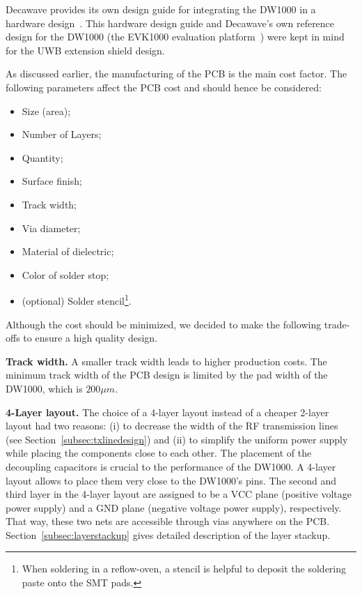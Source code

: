 \documentclass[journal,comsoc]{IEEEtran}
\begin{document}
Decawave provides its own design guide for integrating the DW1000 in a hardware design~\cite{dw1000hwdesignguide}.
This hardware design guide and Decawave's own reference design for the DW1000 (the EVK1000 evaluation platform~\cite{evk1000um}) were kept in mind for the UWB extension shield design.

As discussed earlier, the manufacturing of the PCB is the main cost factor. 
The following parameters affect the PCB cost and should hence be considered:
\begin{itemize}
	\item Size (area);
	\item Number of Layers;
	\item Quantity;
	\item Surface finish;
	\item Track width;
	\item Via diameter;
	\item Material of dielectric;
	\item Color of solder stop;
	\item (optional) Solder stencil\footnote{When soldering in a reflow-oven, a stencil is helpful to deposit the soldering paste onto the SMT pads.}.
\end{itemize}
Although the cost should be minimized, we decided to make the following trade-offs to ensure a high quality design. 

\vspace*{0.5em}
\noindent\textbf{Track width.} A smaller track width leads to higher production costs. 
The minimum track width of the PCB design is limited by the pad width of the DW1000, which is $200\mu m$.

\vspace*{0.5em}
\noindent\textbf{4-Layer layout.} The choice of a 4-layer layout instead of a cheaper 2-layer layout had two reasons: (i) to decrease the width of the RF transmission lines (see Section~\ref{subsec:txlinedesign}) and (ii) to simplify the uniform power supply while placing the components close to each other.
The placement of the decoupling capacitors is crucial to the performance of the DW1000. 
A 4-layer layout allows to place them very close to the DW1000's pins.
The second and third layer in the 4-layer layout are assigned to be a VCC plane (positive voltage power supply) and a GND plane (negative voltage power supply), respectively. 
That way, these two nets are accessible through vias anywhere on the PCB. 
Section~\ref{subsec:layerstackup} gives detailed description of the layer stackup.
\end{document}
